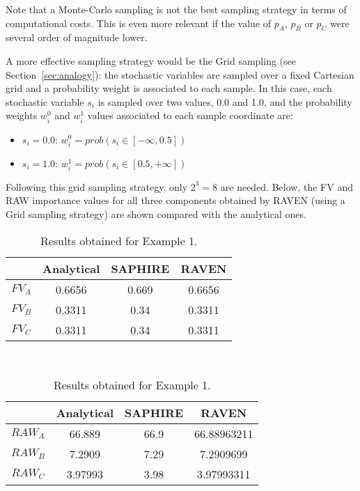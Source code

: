 Note that a Monte-Carlo sampling is not the best sampling strategy in terms of computational 
costs. This is even more relevant if the value of $p_A$, $p_B$ or $p_C$ were several order of 
magnitude lower. 

A more effective sampling strategy would be the Grid sampling (see Section~\ref{sec:analogy}): 
the stochastic variables 
are sampled over a fixed Cartesian grid and a probability weight is associated to each sample. 
In this case, each stochastic variable $s_i$ is sampled over two values, 0.0 and 1.0, and the 
probability weights $w_i^0$ and $w_i^1$ values associated to each sample coordinate are:
\begin{itemize}
  \item $s_i=0.0$: $w_i^0=prob(s_i \in [-\infty,0.5])$
  \item $s_i=1.0$: $w_i^1=prob(s_i \in [0.5,+\infty])$
\end{itemize}
Following this grid sampling strategy, only $2^3=8$ are needed.
Below, the FV and RAW importance values for all three components obtained by RAVEN (using a 
Grid sampling strategy) are shown compared with the analytical ones.

\begin{table}
    \caption{Results obtained for Example 1.}
    \centering
    \begin{minipage}{.5\linewidth}
      \centering
      \begin{tabular}{c | c | c | c} 
        \hline 
         & Analytical & SAPHIRE & RAVEN \\ 
        \hline 
        $FV_A$ & 0.6656 & 0.669 & 0.6656   \\
        $FV_B$ & 0.3311 & 0.34 & 0.3311   \\
        $FV_C$ & 0.3311 & 0.34 & 0.3311   \\
        \hline 
      \end{tabular}
    \end{minipage}\\
    \begin{minipage}{.5\linewidth}
      \centering
      \begin{tabular}{c | c | c | c} 
        \hline 
         & Analytical & SAPHIRE & RAVEN \\ 
        \hline 
        $RAW_A$ & 66.889  & 66.9 & 66.88963211  \\
        $RAW_B$ & 7.2909  & 7.29 & 7.2909699    \\
        $RAW_C$ & 3.97993 & 3.98 & 3.97993311   \\
        \hline 
      \end{tabular}
    \end{minipage} 
\end{table}


